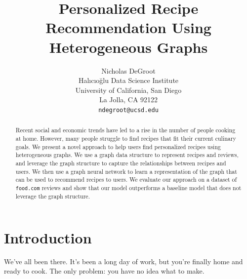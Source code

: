 \documentclass{article}
\title{Personalized Recipe Recommendation Using Heterogeneous Graphs}
\author{%
  Nicholas DeGroot \\
  Halıcıoğlu Data Science Institute \\
  University of California, San Diego \\
  La Jolla, CA 92122 \\
  \texttt{ndegroot@ucsd.edu}
}
\begin{document}
\maketitle


\begin{abstract}
  Recent social and economic trends have led to a rise in the number of people cooking at home. However, many people struggle to find recipes that fit their current culinary goals. We present a novel approach to help users find personalized recipes using heterogeneous graphs. We use a graph data structure to represent recipes and reviews, and leverage the graph structure to capture the relationships between recipes and users. We then use a graph neural network to learn a representation of the graph that can be used to recommend recipes to users. We evaluate our approach on a dataset of \verb|food.com| reviews and show that our model outperforms a baseline model that does not leverage the graph structure.
\end{abstract}


\section{Introduction}
% 
% 
% 
% 


We've all been there. It's been a long day of work, but you're finally home and ready to cook. The only problem: you have no idea what to make.
\end{document}
